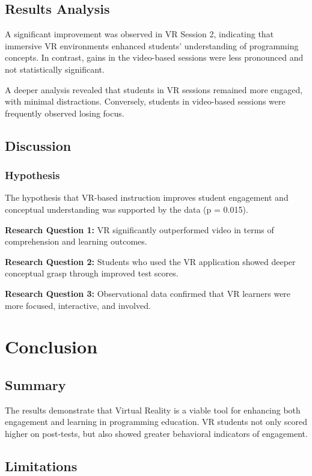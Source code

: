 \documentclass[conference]{IEEEtran}
\begin{document}
\subsection{Results Analysis}

A significant improvement was observed in VR Session 2, indicating that immersive VR environments enhanced students’ understanding of programming concepts. In contrast, gains in the video-based sessions were less pronounced and not statistically significant.

A deeper analysis revealed that students in VR sessions remained more engaged, with minimal distractions. Conversely, students in video-based sessions were frequently observed losing focus.

\subsection{Discussion}

\subsubsection*{Hypothesis}
The hypothesis that VR-based instruction improves student engagement and conceptual understanding was supported by the data (p = 0.015).

\textbf{Research Question 1:} VR significantly outperformed video in terms of comprehension and learning outcomes.

\textbf{Research Question 2:} Students who used the VR application showed deeper conceptual grasp through improved test scores.

\textbf{Research Question 3:} Observational data confirmed that VR learners were more focused, interactive, and involved.

\section{Conclusion}

\subsection{Summary}

The results demonstrate that Virtual Reality is a viable tool for enhancing both engagement and learning in programming education. VR students not only scored higher on post-tests, but also showed greater behavioral indicators of engagement.

\subsection{Limitations}
\end{document}
